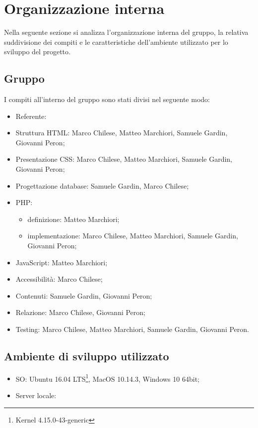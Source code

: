\section{Organizzazione interna}
Nella seguente sezione si analizza l'organizzazione interna del gruppo, la relativa suddivisione dei compiti e le caratteristiche dell'ambiente utilizzato per lo sviluppo del progetto.
\subsection{Gruppo}
I compiti all'interno del gruppo sono stati divisi nel seguente modo:
\begin{itemize}
\item Referente:
\item Struttura HTML: Marco Chilese, Matteo Marchiori, Samuele Gardin, Giovanni Peron;
\item Presentazione CSS: Marco Chilese, Matteo Marchiori, Samuele Gardin, Giovanni Peron;
\item Progettazione database: Samuele Gardin, Marco Chilese;
\item PHP: 
\begin{itemize}
	\item definizione: Matteo Marchiori;
	\item implementazione: Marco Chilese, Matteo Marchiori, Samuele Gardin, Giovanni Peron;
\end{itemize}
\item JavaScript: Matteo Marchiori;
\item Accessibilità: Marco Chilese;
\item Contenuti: Samuele Gardin, Giovanni Peron;
\item Relazione: Marco Chilese, Giovanni Peron;
\item Testing: Marco Chilese, Matteo Marchiori, Samuele Gardin, Giovanni Peron.
\end{itemize}
\subsection{Ambiente di sviluppo utilizzato}
\begin{itemize}
	\item SO: Ubuntu 16.04 LTS\footnote{Kernel 4.15.0-43-generic}, MacOS 10.14.3, Windows 10 64bit;
	\item Server locale:
\end{itemize}

